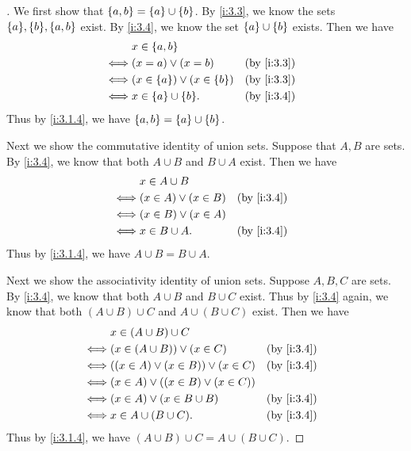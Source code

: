 \begin{proof}[]
  We first show that \(\left\lbrace a, b\right\rbrace = \left\lbrace a\right\rbrace \cup \left\lbrace b\right\rbrace\).
  By \cref{i:3.3}, we know the sets \(\set{a}, \set{b}, \set{a, b}\) exist.
  By \cref{i:3.4}, we know the set \(\left\lbrace a\right\rbrace \cup \left\lbrace b\right\rbrace\) exists.
  Then we have
  \begin{align*}
         & x \in \set{a, b}                                     \\
    \iff & (x = a) \lor (x = b)                 &  & \by{i:3.3} \\
    \iff & (x \in \set{a}) \lor (x \in \set{b}) &  & \by{i:3.3} \\
    \iff & x \in \set{a} \cup \set{b}.          &  & \by{i:3.4}
  \end{align*}
  Thus by \cref{i:3.1.4}, we have \(\left\lbrace a, b\right\rbrace = \left\lbrace a\right\rbrace \cup \left\lbrace b\right\rbrace\).

  Next we show the commutative identity of union sets.
  Suppose that \(A, B\) are sets.
  By \cref{i:3.4}, we know that both \(A \cup B\) and \(B \cup A\) exist.
  Then we have
  \begin{align*}
         & x \in A \cup B                           \\
    \iff & (x \in A) \lor (x \in B) &  & \by{i:3.4} \\
    \iff & (x \in B) \lor (x \in A)                 \\
    \iff & x \in B \cup A.          &  & \by{i:3.4}
  \end{align*}
  Thus by \cref{i:3.1.4}, we have \(A \cup B = B \cup A\).

  Next we show the associativity identity of union sets.
  Suppose \(A, B, C\) are sets.
  By \cref{i:3.4}, we know that both \(A \cup B\) and \(B \cup C\) exist.
  Thus by \cref{i:3.4} again, we know that both \((A \cup B) \cup C\) and \(A \cup (B \cup C)\) exist.
  Then we have
  \begin{align*}
         & x \in (A \cup B) \cup C                                   \\
    \iff & (x \in (A \cup B)) \lor (x \in C)         &  & \by{i:3.4} \\
    \iff & ((x \in A) \lor (x \in B)) \lor (x \in C) &  & \by{i:3.4} \\
    \iff & (x \in A) \lor ((x \in B) \lor (x \in C))                 \\
    \iff & (x \in A) \lor (x \in B \cup B)           &  & \by{i:3.4} \\
    \iff & x \in A \cup (B \cup C).                  &  & \by{i:3.4}
  \end{align*}
  Thus by \cref{i:3.1.4}, we have \((A \cup B) \cup C = A \cup (B \cup C)\).


\end{proof}
